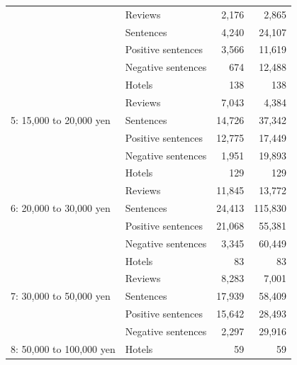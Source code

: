 \documentclass[smallextended,natbib]{svjour3}       %
\begin{document}
\begin{table}[ht]
{\begin{tabular}{|l|l|r|r|}
                                                   & Reviews            & 2,176   & 2,865   \\
                                                   & Sentences          & 4,240   & 24,107  \\
                                                   & Positive sentences & 3,566   & 11,619  \\
                                                   & Negative sentences & 674     & 12,488  \\ \hline
        \multirow{5}{*}{5: 15,000 to 20,000 yen}     & Hotels             & 138     & 138     \\
                                                   & Reviews            & 7,043   & 4,384   \\
                                                   & Sentences          & 14,726  & 37,342  \\
                                                   & Positive sentences & 12,775  & 17,449  \\
                                                   & Negative sentences & 1,951   & 19,893  \\ \hline
        \multirow{5}{*}{6: 20,000 to 30,000 yen}     & Hotels             & 129     & 129     \\
                                                   & Reviews            & 11,845  & 13,772  \\
                                                   & Sentences          & 24,413  & 115,830 \\
                                                   & Positive sentences & 21,068  & 55,381  \\
                                                   & Negative sentences & 3,345   & 60,449  \\ \hline
        \multirow{5}{*}{7: 30,000 to 50,000 yen}     & Hotels             & 83      & 83      \\
                                                   & Reviews            & 8,283   & 7,001   \\
                                                   & Sentences          & 17,939  & 58,409  \\
                                                   & Positive sentences & 15,642  & 28,493  \\
                                                   & Negative sentences & 2,297   & 29,916  \\ \hline
        \multirow{5}{*}{8: 50,000 to 100,000 yen}    & Hotels             & 59      & 59      \\

\end{tabular}}
\end{table}
\end{document}
